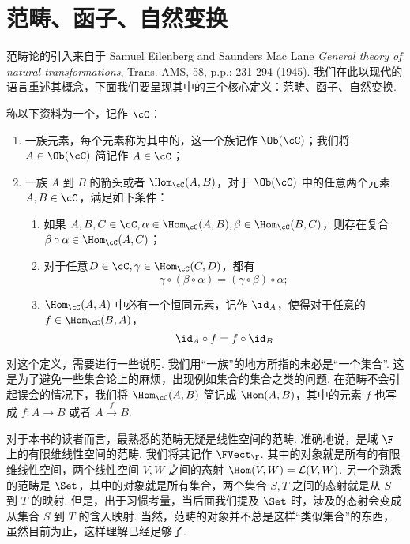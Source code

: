 \section{范畴、函子、自然变换}

范畴论的引入来自于 Samuel Eilenberg and Saunders Mac Lane \emph{General theory of natural transformations}, Trans. AMS, 58, p.p.: 231-294 (1945). 我们在此以现代的语言重述其概念，下面我们要呈现其中的三个核心定义：范畴、函子、自然变换.

\begin{definition}{}{}
    称以下资料为一个，记作 $\cC$：
    \begin{enumerate}
        \item 一族元素，每个元素称为其中的，这一个族记作 $\Ob(\cC)$；我们将 $A \in \Ob(\cC)$ 简记作 $A \in \cC$；
        \item 一族 $A$ 到 $B$ 的箭头或者 $\Hom_\cC (A, B)$，对于 $\Ob(\cC)$ 中的任意两个元素 $A, B \in \cC$，满足如下条件：
              \begin{enumerate}
                  \item 如果 $A, B, C \in \cC, \alpha \in \Hom_\cC (A, B), \beta \in \Hom_\cC (B, C)$，则存在复合 $\beta \circ \alpha \in \Hom_\cC(A, C)$；
                  \item 对于任意$D \in \cC, \gamma \in \Hom_\cC (C, D)$，都有\[
                            \gamma \circ (\beta \circ \alpha)= (\gamma \circ \beta) \circ \alpha;
                        \]
                  \item $\Hom_\cC (A, A)$ 中必有一个恒同元素，记作 $\id_A$，使得对于任意的$f \in \Hom_\cC (B, A)$，
                        \[\id_A \circ f = f \circ \id_B \]
              \end{enumerate}
    \end{enumerate}
\end{definition}

对这个定义，需要进行一些说明. 我们用“一族”的地方所指的未必是“一个集合”. 这是为了避免一些集合论上的麻烦，出现例如集合的集合之类的问题. 在范畴不会引起误会的情况下，我们将 $\Hom_\cC (A, B)$ 简记成 $\Hom (A, B)$，其中的元素 $f$ 也写成 $f\colon A \to B$ 或者 $A \stackrel{f}{\to} B$.

对于本书的读者而言，最熟悉的范畴无疑是线性空间的范畴. 准确地说，是域 $\F$ 上的有限维线性空间的范畴. 我们将其记作 $\FVect_\F$. 其中的对象就是所有的有限维线性空间，两个线性空间 $V, W$ 之间的态射 $\Hom (V, W) = \mathcal{L}(V, W)$. 另一个熟悉的范畴是 $\Set$，其中的对象就是所有集合，两个集合 $S, T$ 之间的态射就是从 $S$ 到 $T$ 的映射. 但是，出于习惯考量，当后面我们提及 $\Set$ 时，涉及的态射会变成从集合 $S$ 到 $T$ 的含入映射. 当然，范畴的对象并不总是这样“类似集合”的东西，虽然目前为止，这样理解已经足够了.

